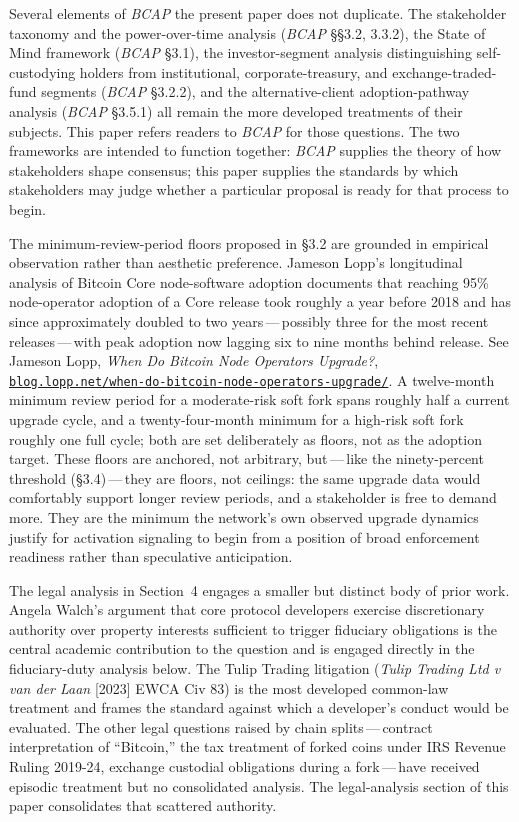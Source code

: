 \documentclass[11pt, twoside, openright]{book}
\newcommand{\sect}[1]{\S#1}
\begin{document}
Several elements of \textit{BCAP} the present paper does not duplicate. The stakeholder taxonomy and the power-over-time analysis (\textit{BCAP} \S\S 3.2, 3.3.2), the State of Mind framework (\textit{BCAP} \sect{3.1}), the investor-segment analysis distinguishing self-custodying holders from institutional, corporate-treasury, and exchange-traded-fund segments (\textit{BCAP} \sect{3.2.2}), and the alternative-client adoption-pathway analysis (\textit{BCAP} \sect{3.5.1}) all remain the more developed treatments of their subjects. This paper refers readers to \textit{BCAP} for those questions. The two frameworks are intended to function together: \textit{BCAP} supplies the theory of how stakeholders shape consensus; this paper supplies the standards by which stakeholders may judge whether a particular proposal is ready for that process to begin.

The minimum-review-period floors proposed in \sect{3.2} are grounded in empirical observation rather than aesthetic preference. Jameson Lopp's longitudinal analysis of Bitcoin Core node-software adoption documents that reaching 95\% node-operator adoption of a Core release took roughly a year before 2018 and has since approximately doubled to two years\,---\,possibly three for the most recent releases\,---\,with peak adoption now lagging six to nine months behind release. See Jameson Lopp, \textit{When Do Bitcoin Node Operators Upgrade?}, \href{https://blog.lopp.net/when-do-bitcoin-node-operators-upgrade/}{\nolinkurl{blog.lopp.net/when-do-bitcoin-node-operators-upgrade/}}. A twelve-month minimum review period for a moderate-risk soft fork spans roughly half a current upgrade cycle, and a twenty-four-month minimum for a high-risk soft fork roughly one full cycle; both are set deliberately as floors, not as the adoption target. These floors are anchored, not arbitrary, but\,---\,like the ninety-percent threshold (\sect{3.4})\,---\,they are floors, not ceilings: the same upgrade data would comfortably support longer review periods, and a stakeholder is free to demand more. They are the minimum the network's own observed upgrade dynamics justify for activation signaling to begin from a position of broad enforcement readiness rather than speculative anticipation.

The legal analysis in Section~4 engages a smaller but distinct body of prior work. Angela Walch's argument that core protocol developers exercise discretionary authority over property interests sufficient to trigger fiduciary obligations is the central academic contribution to the question and is engaged directly in the fiduciary-duty analysis below. The Tulip Trading litigation (\textit{Tulip Trading Ltd v van der Laan} [2023] EWCA Civ 83) is the most developed common-law treatment and frames the standard against which a developer's conduct would be evaluated. The other legal questions raised by chain splits\,---\,contract interpretation of ``Bitcoin,'' the tax treatment of forked coins under IRS Revenue Ruling 2019-24, exchange custodial obligations during a fork\,---\,have received episodic treatment but no consolidated analysis. The legal-analysis section of this paper consolidates that scattered authority.
\end{document}
